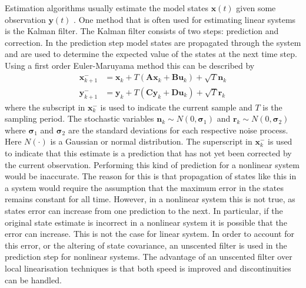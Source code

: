 Estimation algorithms usually estimate the model states $\mathbf{x}(t)$ given some observation $\mathbf{y}(t)$ . One method that is often used for estimating linear systems is the Kalman filter. The Kalman filter consists of two steps: prediction and correction. In the prediction step model states are propagated through the system and are used to determine the expected value of the states at the next time step. Using a first order Euler-Maruyama method this can be described by \begin{align}
\label{eqn: StateProgL}
\mathbf{x}_{k+1}^{-} &= \mathbf{x}_{k} + T(\mathbf{A}\mathbf{x}_{k} +\mathbf{B}\mathbf{u}_{k})+\sqrt{T}\mathbf{n}_{k}\\
\label{eqn: YProp}
\mathbf{y}_{k+1}^{-}  &= \mathbf{y}_{k} + T(\mathbf{C}\mathbf{y}_{k}+\mathbf{D}\mathbf{u}_{k}) +\sqrt{T}\mathbf{r}_{k}
\end{align} where the subscript in $\mathbf{x}_{k}^{-}$ is used to indicate the current sample and $T$ is the sampling period. The stochastic variables $\mathbf{n}_{k}\sim N(0,\mathbf{\sigma}_{1})$ and $\mathbf{r}_{k}\sim N(0,\mathbf{\sigma}_{2})$ where $\mathbf{\sigma}_{1}$ and $\mathbf{\sigma}_2$ are the standard deviations for each respective noise process. Here $N(\cdot)$ is a Gaussian or normal distribution. The superscript in $\mathbf{x}_{k}^{-}$ is used to indicate that this estimate is a prediction that has not yet been corrected by the current observation. Performing this kind of prediction for a nonlinear system would be inaccurate. The reason for this is that propagation of states like this in a system would require the assumption that the maximum error in the states remains constant for all time. However, in a nonlinear system this is not true, as states error can increase from one prediction to the next. In particular, if the original state estimate is incorrect in a nonlinear system it is possible that the error can increase. This is not the case for linear system. In order to account for this error, or the altering of state covariance, an unscented filter is used in the prediction step for nonlinear systems. The advantage of an unscented filter over local linearisation techniques is that both speed is improved and discontinuities can be handled. 

